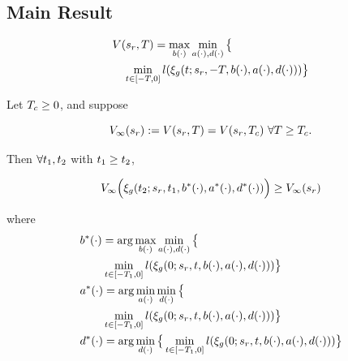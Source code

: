 \subsection{Main Result}

 \begin{equation}
 \begin{aligned}
& V(s_r, T) = \max_{b(\cdot)} \min_{a(\cdot), d(\cdot)} \big\{\\
&\quad \min_{t \in [-T, 0]} l(\xi_g(t; s_r, -T, b(\cdot), a(\cdot), d(\cdot)))\big\} 
 \end{aligned}
  \end{equation}
 
 \begin{thm}
   \label{thm:main}
   Let $T_c \ge 0$, and suppose
   
   \begin{equation}
   \label{eq:conv_valfunc}
   V_\infty(s_r) := V(s_r, T) = V(s_r, T_c) ~ \forall T \ge T_c.
   \end{equation}
   
   Then $\forall t_1, t_2$ with $t_1 \ge t_2$,
   
   \begin{equation}
   V_\infty\Big(\xi_g(t_2; s_r, t_1, b^*(\cdot), a^*(\cdot), d^*(\cdot))\Big) \ge V_\infty(s_r)
   \end{equation}
   
   \noindent where
   \begin{equation}
   \begin{aligned}
   & b^*(\cdot) = \arg \max_{b(\cdot)} \min_{a(\cdot), d(\cdot)}\big\{ \\
   & \qquad \min_{t \in [-T_1, 0]} l(\xi_g(0; s_r, t, b(\cdot), a(\cdot), d(\cdot))) \big\}\\
   & a^*(\cdot) = \arg \min_{a(\cdot)} \min_{d(\cdot)} \big\{ \\
   & \qquad \min_{t \in [-T_1, 0]} l(\xi_g(0; s_r, t, b(\cdot), a(\cdot), d(\cdot))) \big\} \\
   & d^*(\cdot) = \arg \min_{d(\cdot)} \big\{\min_{t \in [-T_1, 0]} l(\xi_g(0; s_r, t, b(\cdot), a(\cdot),  d(\cdot))) \big\}
   \end{aligned}
   \end{equation}
   
 \end{thm}
 
